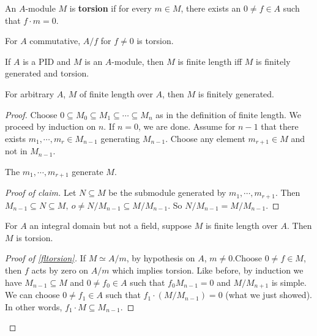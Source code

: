 \begin{definition}[]
    An $A$-module $M$ is \textbf{torsion} if for every $m \in M$, there exists an $0\neq f \in A$ such that $f \cdot m=0$.
\end{definition}
\begin{example}
    For $A$ commutative, $A / f$ for $f\neq 0$ is torsion.
\end{example}
\begin{prop}\label{flfg} 
    If $A$ is a PID and $M$ is an $A$-module, then $M$ is finite length iff $M$ is finitely generated and torsion.
\end{prop}
\begin{lemma}
    For arbitrary $A $, $M$ of finite length over $A$, then $M$ is finitely generated.
\end{lemma}
\begin{proof}
    Choose $0 \subseteq M_0 \subseteq M_1 \subseteq  \cdots  \subseteq  M_n $ as in the definition of finite length. We proceed by induction on $n$. If $n=0$, we are done. Assume for $n-1$ that there exists $m_1, \cdots ,m_r \in  M _{n-1}$ generating $M _{n-1}$. Choose any element $m _{r+1}\in M$ and not in $M_{n-1}$.
    \begin{claim}
        The $m_1, \cdots , m_{r+1}$ generate $M$.
    \end{claim}
    \begin{proof}[Proof of claim]
       Let $N \subseteq M$ be the submodule generated by $m_1 ,\cdots ,m _{r+1}$. Then $M _{n-1} \subseteq N \subseteq M, \ o \neq N / M_{n-1}  \subseteq M / M_{n-1}.$ So $N / M_{n-1}= M / M_{n-1}$.
    \end{proof}
    \begin{lemma}\label{fltorsion} 
        For $A$ an integral domain but not a field, suppose  $M$ is finite length over $A$. Then $M$ is torsion.
    \end{lemma}
    \begin{proof}[Proof of \cref{fltorsion}]
        If $M \simeq  A / m$, by hypothesis on $A$, $m\neq 0$.Choose $0\neq f \in  M$, then $f$ acts by zero on $A / m$ which implies torsion. Like before, by induction we have $M _{n-1}\subseteq M$ and $0\neq f_0 \in A$ such that $f_0 M_{n-1}=0$ and $M / M _{n+1}$ is simple. We can choose $0\neq f_1 \in A$ such that $f _1 \cdot ( M / M _{n-1})=0$ (what we just showed). In other words, $f_1 \cdot  M \subseteq  M_{n-1}$.
    \end{proof}
\end{proof}

